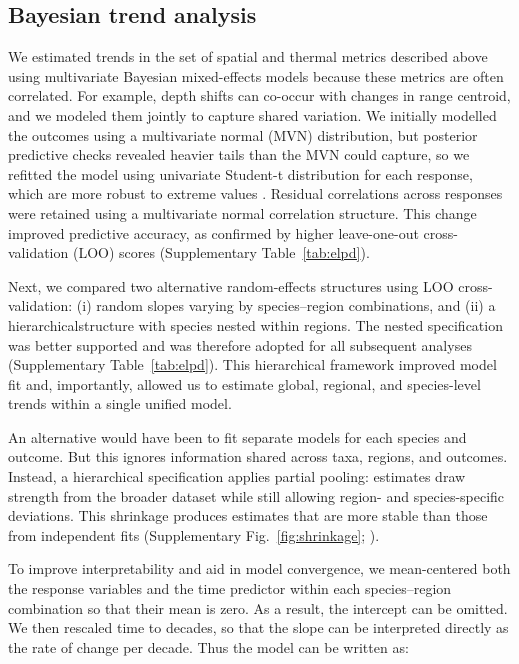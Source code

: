 \documentclass[lineno,pdflatex,sn-nature]{sn-jnl}%
\begin{document}
\subsection{Bayesian trend analysis}\label{sec:Bayesian trend analysis}

We estimated trends in the set of spatial and thermal metrics described above using multivariate Bayesian mixed-effects models because these metrics are often correlated. For example, depth shifts can co-occur with changes in range centroid, and we modeled them jointly to capture shared variation. We initially modelled the outcomes using a multivariate normal (MVN) distribution, but posterior predictive checks revealed heavier tails than the MVN could capture, so we refitted the model using univariate Student-t distribution for each response, which are more robust to extreme values \citep[e.g.,][]{anderson_black-swan_2017}. Residual correlations across responses were retained using a multivariate normal correlation structure. This change improved predictive accuracy, as confirmed by higher leave-one-out cross-validation (LOO) scores \citep{vehtari_practical_2017} (Supplementary Table~\ref{tab:elpd}).

Next, we compared two alternative random-effects structures using LOO cross-validation: (i) random slopes varying by species–region combinations, and (ii) a hierarchicalstructure with species nested within regions. The nested specification was better supported and was therefore adopted for all subsequent analyses (Supplementary Table~\ref{tab:elpd}). This hierarchical framework improved model fit and, importantly, allowed us to estimate global, regional, and species-level trends within a single unified model.

An alternative would have been to fit separate models for each species and outcome. But this ignores information shared across taxa, regions, and outcomes. Instead, a hierarchical specification applies partial pooling: estimates draw strength from the broader dataset while still allowing region- and species-specific deviations. This shrinkage produces estimates that are more stable than those from independent fits (Supplementary Fig.~\ref{fig:shrinkage}; \citealt{mcelreath_statistical_2018}).


To improve interpretability and aid in model convergence, we mean-centered both the response variables and the time predictor within each species–region combination so that their mean is zero. As a result, the intercept can be omitted. We then rescaled time to decades, so that the slope can be interpreted directly as the rate of change per decade.
Thus the model can be written as:
\end{document}
